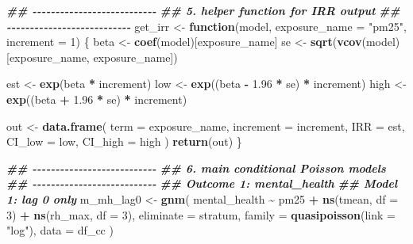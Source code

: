 \documentclass[
]{article}
\newenvironment{Shaded}{\begin{snugshade}}{\end{snugshade}}
\newcommand{\AttributeTok}[1]{\textcolor[rgb]{0.13,0.29,0.53}{#1}}
\newcommand{\ControlFlowTok}[1]{\textcolor[rgb]{0.13,0.29,0.53}{\textbf{#1}}}
\newcommand{\DecValTok}[1]{\textcolor[rgb]{0.00,0.00,0.81}{#1}}
\newcommand{\DocumentationTok}[1]{\textcolor[rgb]{0.56,0.35,0.01}{\textbf{\textit{#1}}}}
\newcommand{\FloatTok}[1]{\textcolor[rgb]{0.00,0.00,0.81}{#1}}
\newcommand{\FunctionTok}[1]{\textcolor[rgb]{0.13,0.29,0.53}{\textbf{#1}}}
\newcommand{\NormalTok}[1]{#1}
\newcommand{\OtherTok}[1]{\textcolor[rgb]{0.56,0.35,0.01}{#1}}
\newcommand{\SpecialCharTok}[1]{\textcolor[rgb]{0.81,0.36,0.00}{\textbf{#1}}}
\newcommand{\StringTok}[1]{\textcolor[rgb]{0.31,0.60,0.02}{#1}}
\begin{document}
\begin{Shaded}
\begin{Highlighting}[]
\DocumentationTok{\#\# {-}{-}{-}{-}{-}{-}{-}{-}{-}{-}{-}{-}{-}{-}{-}{-}{-}{-}{-}{-}{-}{-}{-}{-}{-}{-}{-}}
\DocumentationTok{\#\# 5. helper function for IRR output}
\DocumentationTok{\#\# {-}{-}{-}{-}{-}{-}{-}{-}{-}{-}{-}{-}{-}{-}{-}{-}{-}{-}{-}{-}{-}{-}{-}{-}{-}{-}{-}}
\NormalTok{get\_irr }\OtherTok{\textless{}{-}} \ControlFlowTok{function}\NormalTok{(model, }\AttributeTok{exposure\_name =} \StringTok{"pm25"}\NormalTok{, }\AttributeTok{increment =} \DecValTok{1}\NormalTok{) \{}
\NormalTok{  beta }\OtherTok{\textless{}{-}} \FunctionTok{coef}\NormalTok{(model)[exposure\_name]}
\NormalTok{  se   }\OtherTok{\textless{}{-}} \FunctionTok{sqrt}\NormalTok{(}\FunctionTok{vcov}\NormalTok{(model)[exposure\_name, exposure\_name])}

\NormalTok{  est  }\OtherTok{\textless{}{-}} \FunctionTok{exp}\NormalTok{(beta }\SpecialCharTok{*}\NormalTok{ increment)}
\NormalTok{  low  }\OtherTok{\textless{}{-}} \FunctionTok{exp}\NormalTok{((beta }\SpecialCharTok{{-}} \FloatTok{1.96} \SpecialCharTok{*}\NormalTok{ se) }\SpecialCharTok{*}\NormalTok{ increment)}
\NormalTok{  high }\OtherTok{\textless{}{-}} \FunctionTok{exp}\NormalTok{((beta }\SpecialCharTok{+} \FloatTok{1.96} \SpecialCharTok{*}\NormalTok{ se) }\SpecialCharTok{*}\NormalTok{ increment)}

\NormalTok{  out }\OtherTok{\textless{}{-}} \FunctionTok{data.frame}\NormalTok{(}
    \AttributeTok{term =}\NormalTok{ exposure\_name,}
    \AttributeTok{increment =}\NormalTok{ increment,}
    \AttributeTok{IRR =}\NormalTok{ est,}
    \AttributeTok{CI\_low =}\NormalTok{ low,}
    \AttributeTok{CI\_high =}\NormalTok{ high}
\NormalTok{  )}
  \FunctionTok{return}\NormalTok{(out)}
\NormalTok{\}}
\end{Highlighting}
\end{Shaded}

\begin{Shaded}
\begin{Highlighting}[]
\DocumentationTok{\#\# {-}{-}{-}{-}{-}{-}{-}{-}{-}{-}{-}{-}{-}{-}{-}{-}{-}{-}{-}{-}{-}{-}{-}{-}{-}{-}{-}}
\DocumentationTok{\#\# 6. main conditional Poisson models}
\DocumentationTok{\#\# {-}{-}{-}{-}{-}{-}{-}{-}{-}{-}{-}{-}{-}{-}{-}{-}{-}{-}{-}{-}{-}{-}{-}{-}{-}{-}{-}}
\DocumentationTok{\#\# Outcome 1: mental\_health}
\DocumentationTok{\#\# Model 1: lag 0 only}
\NormalTok{m\_mh\_lag0 }\OtherTok{\textless{}{-}} \FunctionTok{gnm}\NormalTok{(}
\NormalTok{  mental\_health }\SpecialCharTok{\textasciitilde{}}\NormalTok{ pm25 }\SpecialCharTok{+} \FunctionTok{ns}\NormalTok{(tmean, }\AttributeTok{df =} \DecValTok{3}\NormalTok{) }\SpecialCharTok{+} \FunctionTok{ns}\NormalTok{(rh\_max, }\AttributeTok{df =} \DecValTok{3}\NormalTok{),}
  \AttributeTok{eliminate =}\NormalTok{ stratum,}
  \AttributeTok{family =} \FunctionTok{quasipoisson}\NormalTok{(}\AttributeTok{link =} \StringTok{"log"}\NormalTok{),}
  \AttributeTok{data =}\NormalTok{ df\_cc}
\NormalTok{)}
\end{Highlighting}
\end{Shaded}
\end{document}
